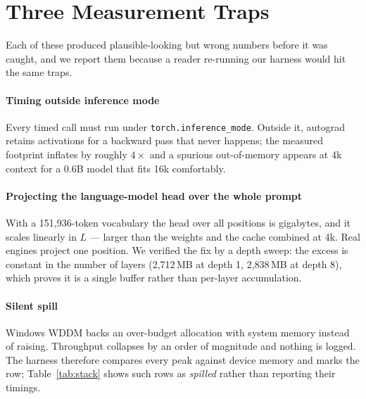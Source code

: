 \documentclass[5p]{elsarticle}
\begin{document}
\section{Three Measurement Traps}
\label{app:trap}

Each of these produced plausible-looking but wrong numbers before it was caught,
and we report them because a reader re-running our harness would hit the same
traps.

\paragraph*{Timing outside inference mode} Every timed call must run under
\texttt{torch.inference\_mode}. Outside it, autograd retains activations for a
backward pass that never happens; the measured footprint inflates by roughly
$4\times$ and a spurious out-of-memory appears at 4k context for a 0.6B model
that fits 16k comfortably.

\paragraph*{Projecting the language-model head over the whole prompt} With a
151{,}936-token vocabulary the head over all positions is gigabytes, and it
scales linearly in $L$ --- larger than the weights and the cache combined at
4k. Real engines project one position. We verified the fix by a depth sweep: the
excess is constant in the number of layers (2{,}712\,MB at depth 1,
2{,}838\,MB at depth 8), which proves it is a single buffer rather than
per-layer accumulation.

\paragraph*{Silent spill} Windows WDDM backs an over-budget allocation with
system memory instead of raising. Throughput collapses by an order of magnitude
and nothing is logged. The harness therefore compares every peak against device
memory and marks the row; Table~\ref{tab:stack} shows such rows as
\emph{spilled} rather than reporting their timings.



\end{document}
